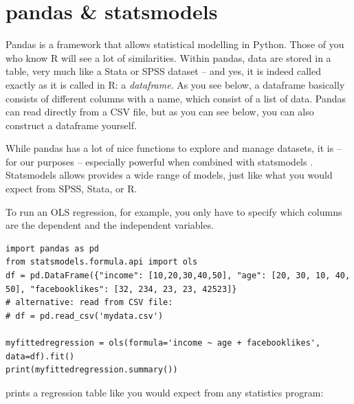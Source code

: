 \documentclass[a4paper,12pt]{book}
\begin{document}
\section{pandas \& statsmodels}
Pandas \citep{pandas} is a framework that allows statistical modelling in Python. Those of you who know R will see a lot of similarities. Within pandas, data are stored in a table, very much like a Stata or SPSS dataset -- and yes, it is indeed called exactly as it is called in R: a \emph{dataframe}.
As you see below, a dataframe basically consists of different columns with a name, which consist of a list of data. Pandas can read directly from a CSV file, but as you can see below, you can also construct a dataframe yourself. 

While pandas has a lot of nice functions to explore and manage datasets, it is -- for our purposes -- especially powerful when combined with statsmodels \citep{statsmodels}. Statsmodels allows provides a wide range of models, just like what you would expect from SPSS, Stata, or R.

To run an OLS regression, for example, you only have to specify which columns are the dependent and the independent variables. 

\begin{lstlisting}
import pandas as pd
from statsmodels.formula.api import ols
df = pd.DataFrame({"income": [10,20,30,40,50], "age": [20, 30, 10, 40, 50], "facebooklikes": [32, 234, 23, 23, 42523]}
# alternative: read from CSV file:
# df = pd.read_csv('mydata.csv')

myfittedregression = ols(formula='income ~ age + facebooklikes', data=df).fit()
print(myfittedregression.summary())

\end{lstlisting}
prints a regression table like you would expect from any statistics program:
\end{document}
